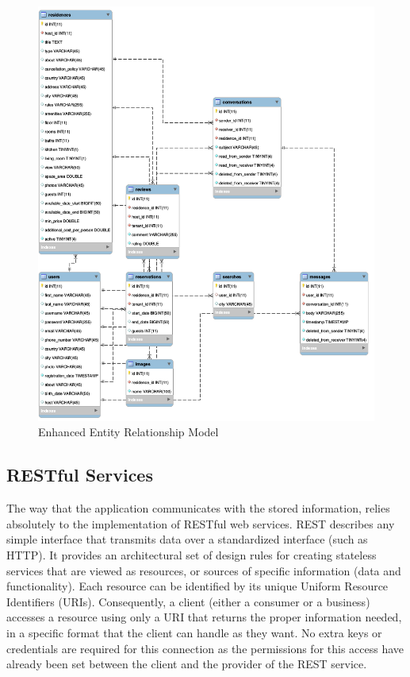 \documentclass[12pt]{article}
\begin{document}
	\begin{figure} [H]
		\begin{center}
			\includegraphics [scale = 0.40] {sxesiakomontelo.jpg}
			\caption{Enhanced Entity Relationship Model}
		\end{center}
	\end{figure}
	
	\subsection{RESTful Services}
	The way that the application communicates with the stored information, relies absolutely to the implementation of RESTful web services. REST describes any simple interface that transmits data over a standardized interface (such as HTTP). It provides an architectural set of design rules for creating stateless services that are viewed as resources, or sources of specific information (data and functionality). Each resource can be identified by its unique Uniform Resource Identifiers (URIs). Consequently, a client (either a consumer or a business) accesses a resource using only a URI that returns the proper information needed, in a specific format that the client can handle as they want. No extra keys or credentials are required for this connection as the permissions for this access have already been set between the client and the provider of the REST service.
	
\end{document}

